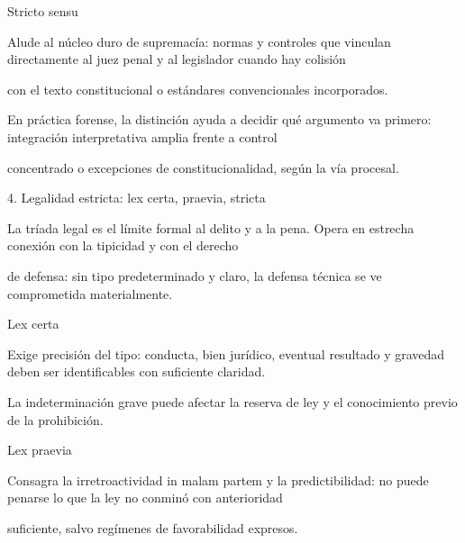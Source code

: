\documentclass[11pt,a4paper]{article}
\begin{document}
          Stricto sensu\par


            Alude al núcleo duro de supremacía: normas y controles que vinculan directamente al juez penal y al legislador cuando hay colisión\par
            con el texto constitucional o estándares convencionales incorporados.\par







        En práctica forense, la distinción ayuda a decidir qué argumento va primero: integración interpretativa amplia frente a control\par
        concentrado o excepciones de constitucionalidad, según la vía procesal.\par





      4. Legalidad estricta: lex certa, praevia, stricta\par


        La tríada legal es el límite formal al delito y a la pena. Opera en estrecha conexión con la tipicidad y con el derecho\par
        de defensa: sin tipo predeterminado y claro, la defensa técnica se ve comprometida materialmente.\par




          Lex certa\par

            Exige precisión del tipo: conducta, bien jurídico, eventual resultado y gravedad deben ser identificables con suficiente claridad.\par
            La indeterminación grave puede afectar la reserva de ley y el conocimiento previo de la prohibición.\par





          Lex praevia\par

            Consagra la irretroactividad in malam partem y la predictibilidad: no puede penarse lo que la ley no conminó con anterioridad\par
            suficiente, salvo regímenes de favorabilidad expresos.\par
\end{document}

